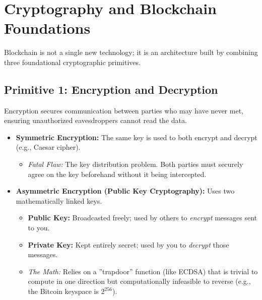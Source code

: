 \section{Cryptography and Blockchain Foundations}

Blockchain is not a single new technology; it is an architecture built by
combining three foundational cryptographic primitives.

\subsection{Primitive 1: Encryption and Decryption}
Encryption secures communication between parties who may have never met,
ensuring unauthorized eavesdroppers cannot read the data.
\begin{itemize}
    \item \textbf{Symmetric Encryption:} The same key is used to both encrypt and decrypt (e.g.,
          Caesar cipher).
          \begin{itemize}
              \item \textit{Fatal Flaw:} The key distribution problem. Both parties must securely agree on
                    the key beforehand without it being intercepted.
          \end{itemize}
    \item \textbf{Asymmetric Encryption (Public Key Cryptography):} Uses two mathematically
          linked keys.
          \begin{itemize}
              \item \textbf{Public Key:} Broadcasted freely; used by others to \textit{encrypt} messages sent to you.
              \item \textbf{Private Key:} Kept entirely secret; used by you to \textit{decrypt} those messages.
              \item \textit{The Math:} Relies on a ''trapdoor'' function (like ECDSA) that is trivial to
                    compute in one direction but computationally infeasible to reverse (e.g., the
                    Bitcoin keyspace is $2^{256}$).
          \end{itemize}
\end{itemize}

